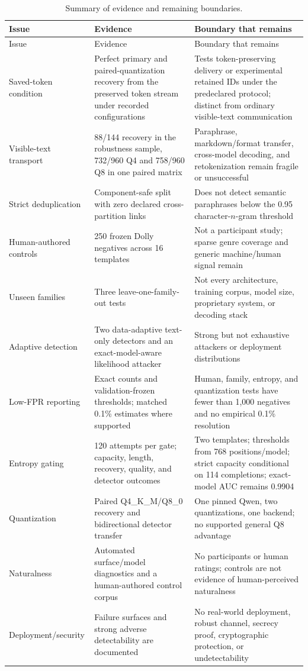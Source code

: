 \documentclass[fleqn,10pt]{wlscirep}
\begin{document}
\begin{longtable}{L{0.23\textwidth}L{0.32\textwidth}L{0.36\textwidth}}
\caption{\label{tab:v3-boundaries}Summary of evidence and remaining boundaries.}\\
\toprule
Issue & Evidence & Boundary that remains \\
\midrule
\endfirsthead
\toprule
Issue & Evidence & Boundary that remains \\
\midrule
\endhead
Saved-token condition & Perfect primary and paired-quantization recovery from the preserved token stream under recorded configurations & Tests token-preserving delivery or experimental retained IDs under the predeclared protocol; distinct from ordinary visible-text communication \\
Visible-text transport & 88/144 recovery in the robustness sample, 732/960 Q4 and 758/960 Q8 in one paired matrix & Paraphrase, markdown/format transfer, cross-model decoding, and retokenization remain fragile or unsuccessful \\
Strict deduplication & Component-safe split with zero declared cross-partition links & Does not detect semantic paraphrases below the 0.95 character-\(n\)-gram threshold \\
Human-authored controls & 250 frozen Dolly negatives across 16 templates & Not a participant study; sparse genre coverage and generic machine/human signal remain \\
Unseen families & Three leave-one-family-out tests & Not every architecture, training corpus, model size, proprietary system, or decoding stack \\
Adaptive detection & Two data-adaptive text-only detectors and an exact-model-aware likelihood attacker & Strong but not exhaustive attackers or deployment distributions \\
Low-FPR reporting & Exact counts and validation-frozen thresholds; matched 0.1\% estimates where supported & Human, family, entropy, and quantization tests have fewer than 1,000 negatives and no empirical 0.1\% resolution \\
Entropy gating & 120 attempts per gate; capacity, length, recovery, quality, and detector outcomes & Two templates; thresholds from 768 positions/model; strict capacity conditional on 114 completions; exact-model AUC remains 0.9904 \\
Quantization & Paired Q4\_K\_M/Q8\_0 recovery and bidirectional detector transfer & One pinned Qwen, two quantizations, one backend; no supported general Q8 advantage \\
Naturalness & Automated surface/model diagnostics and a human-authored control corpus & No participants or human ratings; controls are not evidence of human-perceived naturalness \\
Deployment/security & Failure surfaces and strong adverse detectability are documented & No real-world deployment, robust channel, secrecy proof, cryptographic protection, or undetectability \\
\bottomrule
\end{longtable}
\end{document}
